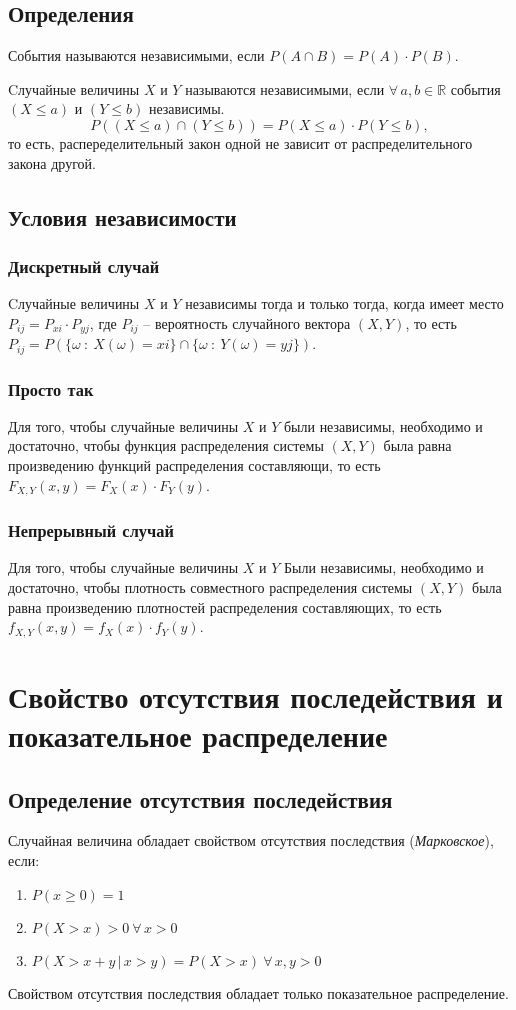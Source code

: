 \documentclass{article}
\newcommand{\R}{\mathbb{R}}
\begin{document}
\subsection{Определения}
События называются независимыми, если $P(A \cap B) = P(A) \cdot P(B)$.

Cлучайные величины $X$ и $Y$ называются независимыми, если $\forall\,a,b\in\R$ события $(X\leq a)$
и $(Y\leq b)$ независимы.
$$ P((X\leq a)\cap(Y\leq b))=P(X\leq a)\cdot P(Y\leq b), $$
то есть, распеределительный закон одной не зависит от распределительного закона другой.

\subsection{Условия независимости}
\subsubsection{Дискретный случай}
Cлучайные величины $X$ и $Y$ независимы тогда и только тогда, когда имеет место $P_{ij}=P_{xi}\cdot P_{yj}$, где $P_{ij}$ -- вероятность случайного вектора $(X,Y)$, то есть $P_{ij}=P(\{\omega\::\:X(\omega)=xi\}\cap\{\omega\::\:Y(\omega)=yj\})$.
\subsubsection{Просто так}
Для того, чтобы случайные величины $X$ и $Y$ были независимы, необходимо и достаточно, чтобы функция распределения системы $(X,Y)$ была равна произведению функций распределения составляющи, то есть $F_{X,Y}(x,y)=F_X(x)\cdot F_Y(y)$.
\subsubsection{Непрерывный случай}
Для того, чтобы случайные величины $X$ и $Y$ Были независимы, необходимо и достаточно, чтобы плотность совместного распределения системы $(X,Y)$ была равна произведению плотностей распределения составляющих, то есть $f_{X,Y}(x,y)=f_X(x)\cdot f_Y(y)$.
\newpage
\section{Свойство отсутствия последействия и показательное распределение}
\subsection{Определение отсутствия последействия}
Случайная величина обладает свойством отсутствия последствия (\textit{Марковское}), если:
\begin{enumerate}
    \item $P(x\geq0)=1$
    \item$P(X>x)>0\:\forall\,x>0$
    \item $P(X>x+y\,|\,x>y)=P(X>x)\:\forall\,x,y>0$
\end{enumerate}
Свойством отсутствия последствия обладает только показательное распределение.
\end{document}
